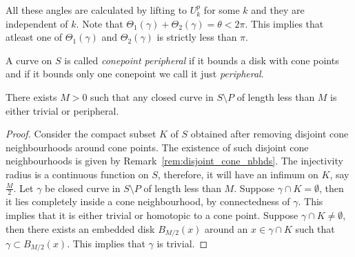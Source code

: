 \noindent All these angles are calculated by lifting to $U_k^p$ for some $k$ and they are independent of $k$. Note that $\Theta_1(\gamma)+ \Theta_2(\gamma) = \theta < 2\pi$. This implies that atleast one of $\Theta_1(\gamma)$ and $\Theta_2(\gamma)$ is strictly less than $\pi$.    
%
%	
%

\begin{defn} \label{Peripheral}
	A curve on $S$ is called \textit{conepoint peripheral} if it bounds a disk with cone points and if it bounds only one conepoint we call it just \textit{peripheral}.
\end{defn}

\begin{prop}\label{ShortCurves}
	There exists $M > 0$ such that any closed curve in $S \setminus P$ of length less than $M$ is either trivial or peripheral. 
\end{prop}

\begin{proof}
	Consider the compact subset $K$ of $S$ obtained after removing disjoint cone neighbourhoods around cone points. The existence of such disjoint cone neighbourhoods is given by Remark~\ref{rem:disjoint_cone_nbhds}. The injectivity radius is a continuous function on $S$, therefore, it will have an infimum on $K$, say $\frac{M}{2}$. Let $\gamma$ be closed curve in $S \setminus P$ of length less than $M$. Suppose $\gamma \cap K = \emptyset$, then it lies completely inside a cone neighbourhood, by connectedness of $\gamma$. This implies that it is either trivial or homotopic to a cone point. 
	Suppose $\gamma \cap K \neq \emptyset$, then there exists an embedded disk $B_{M/2}(x)$ around an $x \in \gamma \cap K$ such that $\gamma \subset B_{M/2}(x)$. This implies that $\gamma$ is trivial.
\end{proof}

